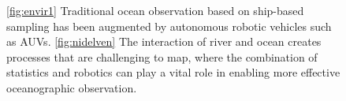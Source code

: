 \documentclass[aoas]{imsart}
\begin{document}
\begin{figure}[!h] 
  \centering 
  \hfill
  \caption{\ref{fig:envir1} Traditional ocean observation based on 
    ship-based sampling has been augmented by autonomous
    robotic vehicles such as AUVs. %
    \ref{fig:nidelven} The interaction of river and ocean creates
    processes that are challenging to map, where the combination of
    statistics and robotics can play a vital role in enabling more
    effective oceanographic observation.}
  \label{fig:envir} \end{figure}
\end{document}
